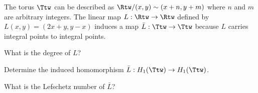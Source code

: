 The torus $\Ttw$ can be described as $\Rtw/(x,y)\sim (x+n,y+m)$ where
$n$ and $m$ are arbitrary integers. The linear map $L:\Rtw\rightarrow
\Rtw$ defined by $L(x,y)=(2x+y,y-x)$ induces a map
$\bar{L}:\Ttw\rightarrow \Ttw$ because $L$ carries integral points to
integral points.
\begin{alist}
\item What is the degree of $L$?
\item Determine the induced homomorphism $\bar{L}:H_1(\Ttw)\rightarrow
H_1(\Ttw)$. 
\item What is the Lefschetz number of $\bar{L}$?
\end{alist}
